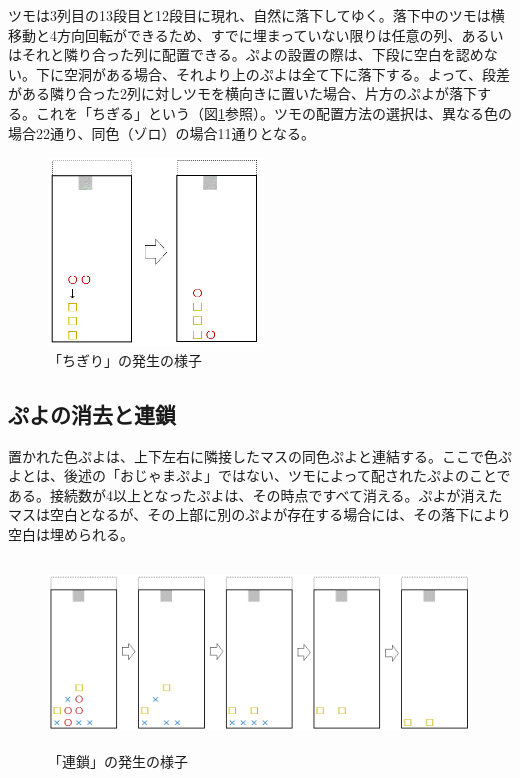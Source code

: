 \documentclass[12pt]{jarticle}
\begin{document}
ツモは3列目の13段目と12段目に現れ、自然に落下してゆく。落下中のツモは横移動と4方向回転ができるため、すでに埋まっていない限りは任意の列、あるいはそれと隣り合った列に配置できる。ぷよの設置の際は、下段に空白を認めない。下に空洞がある場合、それより上のぷよは全て下に落下する。よって、段差がある隣り合った2列に対しツモを横向きに置いた場合、片方のぷよが落下する。これを「ちぎる」という（図\ref{fig:tigiri}参照）。ツモの配置方法の選択は、異なる色の場合22通り、同色（ゾロ）の場合11通りとなる。
\begin{figure}[hbt]
  \begin{center}
  \includegraphics[height=5cm]{img/tigiri.png}
  \caption{「ちぎり」の発生の様子} \label{fig:tigiri}
\end{center}
\end{figure}

\subsection{ぷよの消去と連鎖} \label{del_chain}
置かれた色ぷよは、上下左右に隣接したマスの同色ぷよと連結する。ここで色ぷよとは、後述の「おじゃまぷよ」ではない、ツモによって配されたぷよのことである。接続数が4以上となったぷよは、その時点ですべて消える。ぷよが消えたマスは空白となるが、その上部に別のぷよが存在する場合には、その落下により空白は埋められる。

\begin{figure}[hbt]
  \begin{center}
  \includegraphics[height=5cm]{img/rensa.png}
  \caption{「連鎖」の発生の様子} \label{fig:rensa}
\end{center}
\end{figure}
\end{document}
